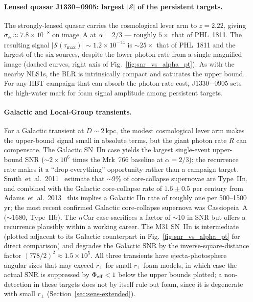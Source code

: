\documentclass[aps,prd,onecolumn,amsmath,amssymb]{revtex4-2}
\begin{document}
\paragraph{Lensed quasar J1330$-$0905: largest $|\mathcal{S}|$ of the
persistent targets.}
The strongly-lensed quasar carries the cosmological lever arm to
$z=2.22$, giving $\sigma_\phi\approx 7.8\times 10^{-8}$ on image~A at
$\alpha=2/3$ --- roughly $5\times$ that of PHL~1811. The resulting
signal $|\mathcal{S}(\tau_{\max})|\sim 1.2\times 10^{-14}$ is
${\sim}25\times$ that of PHL~1811 and the largest of the six sources,
despite the lower photon rate from a single magnified image (dashed
curves, right axis of Fig.~\ref{fig:snr_vs_alpha_pt}).  As with the
nearby NLS1s, the BLR is intrinsically compact and saturates the
upper bound.  For any HBT campaign that can absorb the photon-rate
cost, J1330$-$0905 sets the high-water mark for foam signal amplitude
among persistent targets.

\paragraph{Galactic and Local-Group transients.}
For a Galactic transient at $D\sim 2$\,kpc, the modest cosmological
lever arm makes the upper-bound signal small in absolute terms, but
the giant photon rate $R$ can compensate. The Galactic SN~IIn case
yields the largest single-event upper-bound SNR
(${\sim}2\times 10^6$ times the Mrk~766 baseline at $\alpha=2/3$); the
recurrence rate makes it a ``drop-everything'' opportunity rather
than a campaign target. Smith~et~al.~2011~\cite{Smith2011} estimate
that ${\sim}9\%$ of core-collapse supernovae are Type~IIn, and
combined with the Galactic core-collapse rate of $1.6\pm 0.5$ per
century from Adams~et~al.~2013~\cite{Adams2013} this implies a Galactic
IIn rate of roughly one per 500--1500\,yr; the most recent confirmed
Galactic core-collapse supernova was Cassiopeia~A (${\sim}1680$,
Type~IIb). The $\eta$\,Car case sacrifices a factor of ${\sim}10$ in
SNR but offers a recurrence plausibly within a working career.
The M31 SN~IIn is intermediate (plotted adjacent to its Galactic
counterpart in Fig.~\ref{fig:snr_vs_alpha_pt} for direct comparison)
and degrades the Galactic SNR by the inverse-square-distance factor
$(778/2)^2\approx 1.5\times 10^5$.
All three transients have ejecta-photosphere angular sizes that may
exceed $r_\perp$ for small-$r_\perp$ foam models, in which case the
actual SNR is suppressed by $\Phi_{\rm eff}<1$ below the upper bounds
plotted; a non-detection in these targets does not by itself rule out
foam, since it is degenerate with small $r_\perp$
(Section~\ref{sec:sens-extended}).
\end{document}
